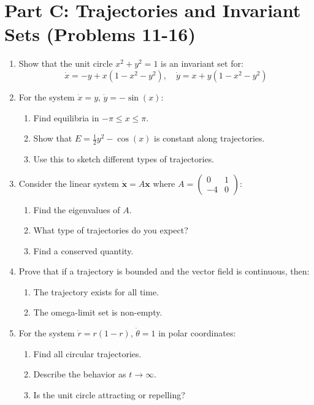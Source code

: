\documentclass[12pt]{article}
\begin{document}
\section*{Part C: Trajectories and Invariant Sets (Problems 11-16)}

\begin{enumerate}[resume]
\item Show that the unit circle $x^2 + y^2 = 1$ is an invariant set for:
$$\dot{x} = -y + x(1 - x^2 - y^2), \quad \dot{y} = x + y(1 - x^2 - y^2)$$

\item For the system $\dot{x} = y$, $\dot{y} = -\sin(x)$:
\begin{enumerate}[label=(\alph*)]
    \item Find equilibria in $-\pi \leq x \leq \pi$.
    \item Show that $E = \frac{1}{2}y^2 - \cos(x)$ is constant along trajectories.
    \item Use this to sketch different types of trajectories.
\end{enumerate}

\item Consider the linear system $\dot{\mathbf{x}} = A\mathbf{x}$ where $A = \begin{pmatrix} 0 & 1 \\ -4 & 0 \end{pmatrix}$:
\begin{enumerate}[label=(\alph*)]
    \item Find the eigenvalues of $A$.
    \item What type of trajectories do you expect?
    \item Find a conserved quantity.
\end{enumerate}

\item Prove that if a trajectory is bounded and the vector field is continuous, then:
\begin{enumerate}[label=(\alph*)]
    \item The trajectory exists for all time.
    \item The omega-limit set is non-empty.
\end{enumerate}

\item For the system $\dot{r} = r(1-r)$, $\dot{\theta} = 1$ in polar coordinates:
\begin{enumerate}[label=(\alph*)]
    \item Find all circular trajectories.
    \item Describe the behavior as $t \to \infty$.
    \item Is the unit circle attracting or repelling?
\end{enumerate}


\end{enumerate}
\end{document}
